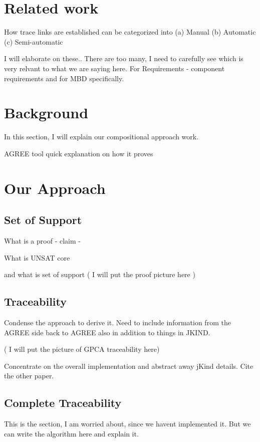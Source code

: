 \section {Related work}
How trace links are established can be categorized into  (a) Manual (b) Automatic (c) Semi-automatic

I will elaborate on these.. There are too many, I need to carefully see which is very relvant to what we are saying here. For Requirements - component requirements and for MBD specifically.


\section {Background}


In this section, I will explain our compositional approach work.

AGREE tool quick explanation on how it proves

\section{Our Approach}


\subsection{Set of Support}

What is a proof  - claim -

What is UNSAT core

and what is set of support ( I will put the proof picture here )


\subsection{Traceability}

Condense the approach to derive it. Need to include information from the AGREE side back to AGREE also in addition to things in JKIND.


( I will put the picture of GPCA traceability here)


Concentrate on the overall implementation and abstract away jKind details. Cite the other paper.


\subsection{Complete Traceability}

 This is the section, I am worried about, since we havent implemented it. But we can write the algorithm here and explain it.




